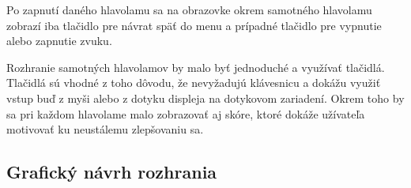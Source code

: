 \documentclass[a4paper,11pt]{report}
\begin{document}
Po zapnutí daného hlavolamu sa na obrazovke okrem samotného hlavolamu zobrazí iba tlačidlo pre návrat späť do menu a prípadné tlačidlo pre vypnutie alebo zapnutie zvuku.

Rozhranie samotných hlavolamov by malo byť jednoduché a využívať tlačidlá. Tlačidlá sú vhodné z toho dôvodu, že nevyžadujú klávesnicu a dokážu využiť vstup buď z myši alebo z dotyku displeja na dotykovom zariadení. Okrem toho by sa pri každom hlavolame malo zobrazovať aj skóre, ktoré dokáže užívateľa motivovať ku neustálemu zlepšovaniu sa.

\subsection*{Grafický návrh rozhrania}
\end{document}
